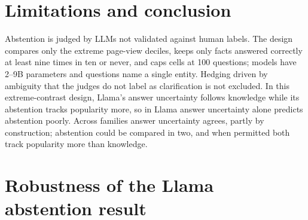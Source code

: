 \documentclass{article}
\begin{document}
\section{Limitations and conclusion}

Abstention is judged by LLMs not validated against human labels. The design compares only the extreme page-view deciles, keeps only facts answered correctly at least nine times in ten or never, and caps cells at 100 questions; models have 2--9B parameters and questions name a single entity. Hedging driven by ambiguity that the judges do not label as clarification is not excluded. In this extreme-contrast design, Llama's answer uncertainty follows knowledge while its abstention tracks popularity more, so in Llama answer uncertainty alone predicts abstention poorly. Across families answer uncertainty agrees, partly by construction; abstention could be compared in two, and when permitted both track popularity more than knowledge.




\appendix

\section{Robustness of the Llama abstention result}
\label{app:robust}
\end{document}
